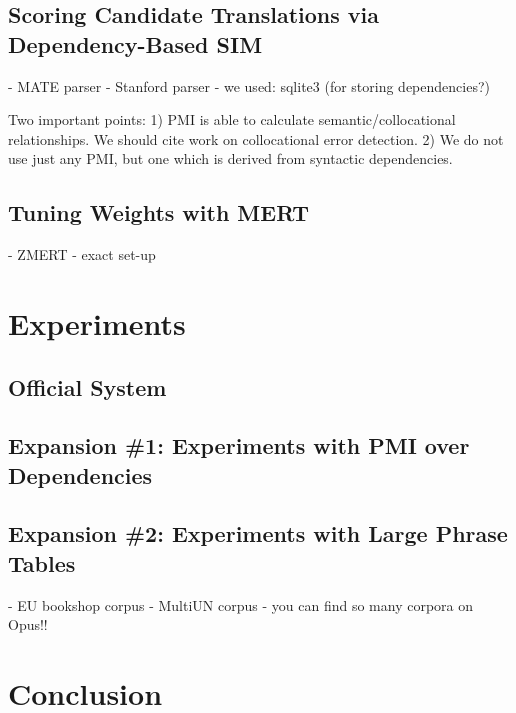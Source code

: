 \documentclass[11pt]{article}
\begin{document}

\subsection{Scoring Candidate Translations via Dependency-Based SIM}
\label{sec:dependencyPMI}

- MATE parser
- Stanford parser
- we used: sqlite3 (for storing dependencies?)

Two important points: 1) PMI is able to calculate semantic/collocational relationships.  We should cite work on collocational error detection.  2) We do not use just any PMI, but one which is derived from syntactic dependencies.

\subsection{Tuning Weights with MERT}
- ZMERT \cite{zaidan:zmert:09}
- exact set-up

\section{Experiments}

\subsection{Official System}
\cite{nltkbook}

\subsection{Expansion \#1: Experiments with PMI over Dependencies}

\subsection{Expansion \#2: Experiments with Large Phrase Tables}

- EU bookshop corpus
- MultiUN corpus
- you can find so many corpora on Opus!! \cite{tiedemann:12}

\section{Conclusion} 



\end{document}
